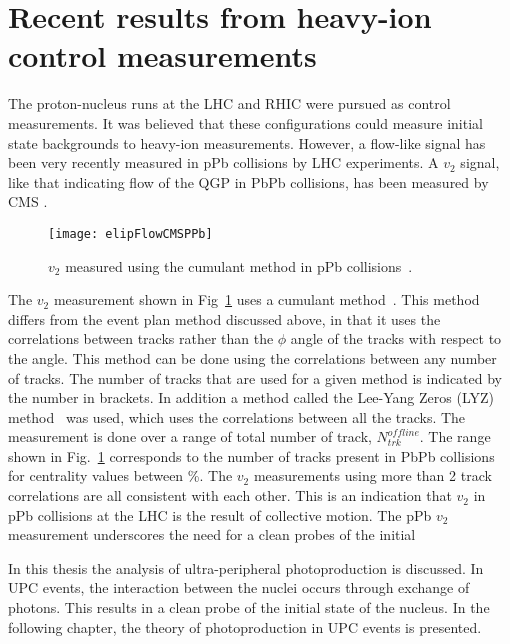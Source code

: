   \section{Recent results from heavy-ion control measurements}
    The proton-nucleus runs at the LHC and RHIC were pursued as
      control measurements. 
    It was believed that these configurations could measure 
      initial state backgrounds to heavy-ion measurements.
    However, a flow-like signal has been very recently measured in pPb 
      collisions by LHC experiments.
    A $v_{2}$ signal, like that indicating flow of the QGP in PbPb collisions,
      has been measured by CMS \cite{Chatrchyan:2013nka}.
    \begin{figure}[!Hhbt]
      \centering
      \texttt{[image: elipFlowCMSPPb]}
      \caption{$v_{2}$ measured using the cumulant method in pPb collisions~\cite{Chatrchyan:2013nka}.}
      \label{fig:pPbFlow}
    \end{figure}

    The $v_{2}$ measurement shown in Fig~\ref{fig:pPbFlow} uses a cumulant 
      method~\cite{Borghini:2001zr}.
    This method differs from the event plan method discussed above, in that 
      it uses the correlations between tracks rather than the $\phi$ angle 
      of the tracks with respect to the \DIFdelbegin {}\DIFdelend \DIFaddbegin {}\DIFaddend angle.
    This method can be done using the correlations between any number of 
      tracks. 
    The number of tracks that are used for a given method is 
      indicated by the number in brackets. 
    In addition a method called the Lee-Yang Zeros (LYZ) method~\cite{Borghini:2004ke,Bhalerao:2003yq} was used, 
      which uses the correlations between all the tracks. 
    The measurement is done over a range of total number of track, 
      $N^{offline}_{trk}$. 
    The range shown in Fig.~\ref{fig:pPbFlow} corresponds to the number of 
      tracks present in PbPb collisions for centrality values between \DIFdelbegin {}\DIFdelend \DIFaddbegin {}\DIFaddend \%.
    The $v_{2}$ measurements using more than 2 track correlations are all 
      consistent with each other.
    This is an indication that $v_{2}$ in pPb collisions at the LHC is the
      result of collective motion.
    The pPb $v_{2}$ measurement underscores the need for a clean probes of the 
      initial\DIFaddbegin {}\DIFaddend 

    In this thesis the analysis of ultra-peripheral \JPsi{} photoproduction 
      is discussed. 
    In UPC events, the interaction between the nuclei occurs through
      exchange of photons. 
    This results in a clean probe of the initial state of the nucleus.
    In the following chapter, the theory of \JPsi{ } photoproduction in 
      UPC events is presented. 

